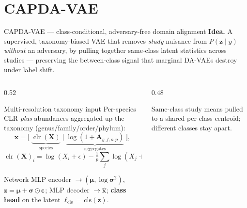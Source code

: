 \documentclass[aspectratio=169,11pt]{beamer}
\newcommand{\clr}{\operatorname{clr}}
\begin{document}
\section{CAPDA-VAE}
\begin{frame}{CAPDA-VAE --- class-conditional, adversary-free domain alignment}
  \textbf{Idea.} A supervised, taxonomy-biased VAE that removes \emph{study} nuisance
  from $P(\mathbf z\mid y)$ \emph{without} an adversary, by pulling together same-class
  latent statistics across studies --- preserving the between-class signal that
  marginal DA-VAEs destroy under label shift.
  \begin{columns}[T]
    \begin{column}{0.52\textwidth}
      \begin{block}{Multi-resolution taxonomy input}
        \footnotesize
        Per-species CLR \emph{plus} abundances aggregated up the taxonomy
        (genus/family/order/phylum):
        \[
          \mathbf x=\big[\;\underbrace{\clr(\mathbf X)}_{\text{species}}
          \;\big|\;\underbrace{\log(1+\mathbf A_{g,f,o,p})}_{\text{aggregates}}\;\big],
        \]
        \[
          \clr(\mathbf X)_i=\log(X_i+\epsilon)-\tfrac1p\!\sum_j\log(X_j+\epsilon).
        \]
      \end{block}
      \begin{block}{Network}
        \footnotesize
        MLP encoder $\to(\bm\mu,\log\bm\sigma^2)$, $\mathbf z=\bm\mu+\bm\sigma\odot\bm\varepsilon$;
        MLP decoder $\to\hat{\mathbf x}$; \textbf{class head} on the latent
        $\bm\ell_{\text{cls}}=\mathrm{cls}(\mathbf z)$.
      \end{block}
    \end{column}
    \begin{column}{0.48\textwidth}
      \centering

      {\footnotesize Same-class study means pulled to a shared per-class
      centroid; different classes stay apart.}
    \end{column}
  \end{columns}
\end{frame}
\end{document}
